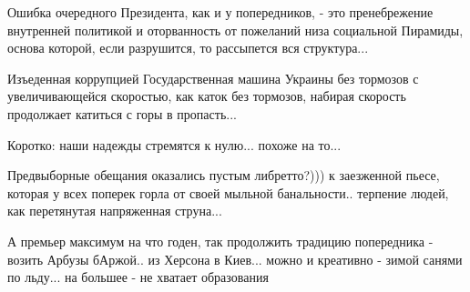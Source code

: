 Ошибка очередного Президента, как и у попередников, - это пренебрежение
внутренней политикой и оторванность от пожеланий низа социальной Пирамиды,
основа которой, если разрушится, то рассыпется вся структура...

Изъеденная коррупцией Государственная машина Украины без тормозов с
увеличивающейся скоростью, как каток без тормозов, набирая скорость продолжает
катиться с горы в пропасть... 

Коротко: наши надежды стремятся к нулю... похоже на то...

Предвыборные обещания оказались пустым либретто?))) к заезженной пьесе, которая
у всех поперек горла от своей мыльной банальности.. терпение людей, как
перетянутая напряженная струна...

А премьер максимум на что годен, так продолжить традицию попередника - возить
Арбузы бАржой.. из Херсона в Киев... можно и креативно - зимой санями по
льду...  на большее  - не хватает образования


